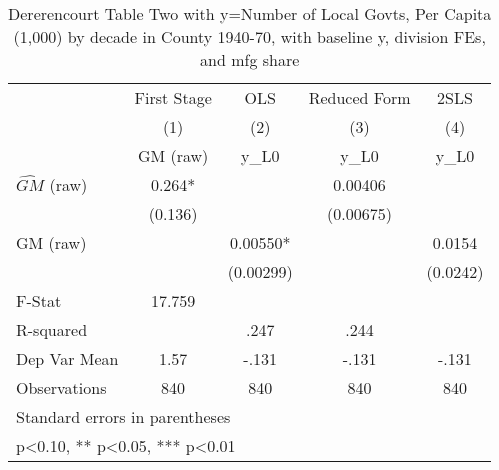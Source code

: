 \begin{table}[htbp]\centering
\def\sym#1{\ifmmode^{#1}\else\(^{#1}\)\fi}
\caption{Dererencourt Table Two with y=Number of Local Govts, Per Capita (1,000) by decade in County 1940-70, with baseline y, division FEs, and mfg share}
\begin{tabular}{l*{4}{c}}
\toprule
                    & First Stage   &         OLS   &Reduced Form   &        2SLS   \\
                    &\multicolumn{1}{c}{(1)}&\multicolumn{1}{c}{(2)}&\multicolumn{1}{c}{(3)}&\multicolumn{1}{c}{(4)}\\
                    &\multicolumn{1}{c}{GM  (raw)}&\multicolumn{1}{c}{y\_L0}&\multicolumn{1}{c}{y\_L0}&\multicolumn{1}{c}{y\_L0}\\
\midrule
$\hat{GM}$ (raw)    &       0.264*  &               &     0.00406   &               \\
                    &     (0.136)   &               &   (0.00675)   &               \\
\addlinespace
GM  (raw)           &               &     0.00550*  &               &      0.0154   \\
                    &               &   (0.00299)   &               &    (0.0242)   \\
\midrule
F-Stat              &      17.759   &               &               &               \\
R-squared           &               &        .247   &        .244   &               \\
Dep Var Mean        &        1.57   &       -.131   &       -.131   &       -.131   \\
Observations        &         840   &         840   &         840   &         840   \\
\bottomrule
\multicolumn{5}{l}{\footnotesize Standard errors in parentheses}\\
\multicolumn{5}{l}{\footnotesize * p<0.10, ** p<0.05, *** p<0.01}\\
\end{tabular}
\end{table}

